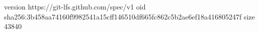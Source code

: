version https://git-lfs.github.com/spec/v1
oid sha256:3b458aa74160f9982541a15cff146510df665fc862c5b2ae6ef18a416805247f
size 43840

